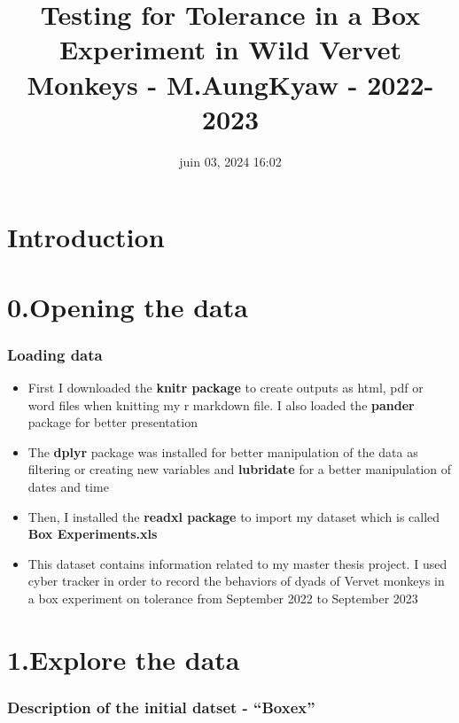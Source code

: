 \documentclass[
]{article}
\title{Testing for Tolerance in a Box Experiment in Wild Vervet Monkeys
- M.AungKyaw - 2022-2023}
\author{}
\date{\vspace{-2.5em}juin 03, 2024 16:02}
\providecommand{\tightlist}{%
  \setlength{\itemsep}{0pt}\setlength{\parskip}{0pt}}
\begin{document}
\maketitle

{
\setcounter{tocdepth}{6}
\tableofcontents
}
\hypertarget{introduction}{%
\section{Introduction}\label{introduction}}

\hypertarget{opening-the-data}{%
\section{0.Opening the data}\label{opening-the-data}}

\hypertarget{loading-data}{%
\subsubsection{Loading data}\label{loading-data}}

\begin{itemize}
\tightlist
\item
  First I downloaded the \textbf{knitr package} to create outputs as
  html, pdf or word files when knitting my r markdown file. I also
  loaded the \textbf{pander} package for better presentation
\item
  The \textbf{dplyr} package was installed for better manipulation of
  the data as filtering or creating new variables and \textbf{lubridate}
  for a better manipulation of dates and time
\item
  Then, I installed the \textbf{readxl package} to import my dataset
  which is called \textbf{Box Experiments.xls}
\item
  This dataset contains information related to my master thesis project.
  I used cyber tracker in order to record the behaviors of dyads of
  Vervet monkeys in a box experiment on tolerance from September 2022 to
  September 2023
\end{itemize}

\hypertarget{explore-the-data}{%
\section{1.Explore the data}\label{explore-the-data}}

\hypertarget{description-of-the-initial-datset---boxex}{%
\subsubsection{Description of the initial datset -
``Boxex''}\label{description-of-the-initial-datset---boxex}}
\end{document}
